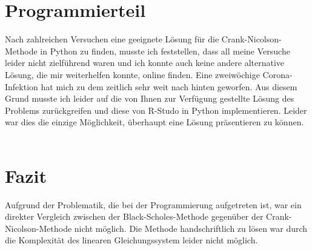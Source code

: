\documentclass[12pt,titlepage]{article}
\begin{document}
\section{Programmierteil}
Nach zahlreichen Versuchen eine geeignete Lösung für die Crank-Nicolson-\\Methode in Python zu finden, musste ich  feststellen, dass all meine Versuche leider nicht zielführend waren und ich konnte auch keine andere alternative Lösung, die mir weiterhelfen konnte, online finden. Eine zweiwöchige Corona-\\Infektion hat mich zu dem zeitlich sehr weit nach hinten geworfen. Aus diesem Grund musste ich leider auf die von Ihnen zur Verfügung gestellte Lösung des Problems zurückgreifen und diese von R-Studo in Python implementieren. Leider war dies die einzige Möglichkeit, überhaupt eine Lösung präsentieren zu können.  \\\\
\section{Fazit}
Aufgrund der Problematik, die bei der Programmierung aufgetreten ist, war ein direkter Vergleich zwischen der Black-Scholes-Methode gegenüber der Crank-Nicolson-Methode nicht möglich. Die Methode handschriftlich zu lösen war durch die Komplexität des linearen Gleichungssystem leider nicht möglich.
\newpage
\end{document}
